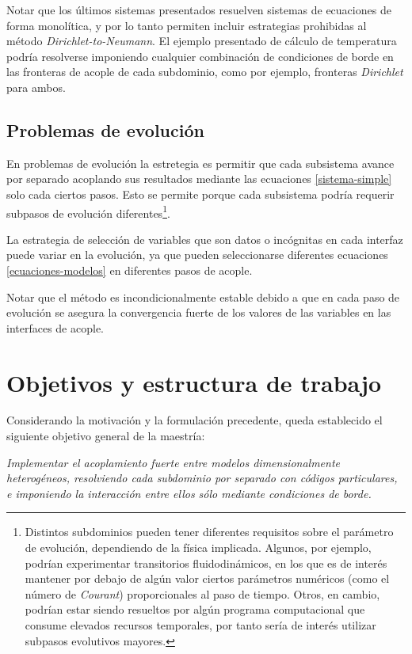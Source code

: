 Notar que los últimos sistemas presentados resuelven sistemas de ecuaciones de forma monolítica, y por lo tanto permiten incluir estrategias prohibidas al método \textit{Dirichlet-to-Neumann}.
El ejemplo presentado de cálculo de temperatura podría resolverse imponiendo cualquier combinación de condiciones de borde en las fronteras de acople de cada subdominio, como por ejemplo, fronteras \textit{Dirichlet} para ambos.

\subsection*{Problemas de evolución}
\label{1:evolucion}
En problemas de evolución la estretegia es permitir que cada subsistema avance por separado acoplando sus resultados mediante las ecuaciones \ref{sistema-simple} solo cada ciertos pasos.
Esto se permite porque cada subsistema podría requerir subpasos de evolución diferentes\footnote{
Distintos subdominios pueden tener diferentes requisitos sobre el parámetro de evolución, dependiendo de la física implicada.
Algunos, por ejemplo, podrían experimentar transitorios fluidodinámicos, en los que es de interés mantener por debajo de algún valor 
ciertos parámetros numéricos (como el número de \textit{Courant}) proporcionales al paso de tiempo.
Otros, en cambio, podrían estar siendo resueltos por algún programa computacional que consume elevados recursos temporales,  por tanto sería de interés utilizar subpasos evolutivos mayores.
}.

La estrategia de selección de variables que son datos o incógnitas en cada interfaz puede variar en la evolución, ya que pueden seleccionarse diferentes ecuaciones \ref{ecuaciones-modelos} en diferentes pasos de acople.

Notar que el método es incondicionalmente estable debido a que 
en cada paso de evolución se asegura la convergencia fuerte de los valores de las variables en las interfaces de acople.

\section{Objetivos y estructura de trabajo}
\label{1:objetivos}
Considerando la motivación y la formulación precedente, queda establecido el siguiente objetivo general de la maestría:

\vspace{1em}
\begin{addmargin}[1.5em]{1.5em}
\textit{Implementar el acoplamiento fuerte entre modelos dimensionalmente heterogéneos,
resolviendo cada subdominio por separado con códigos particulares, e imponiendo la
interacción entre ellos sólo mediante condiciones de borde.}
\end{addmargin}
\vspace{1em}

